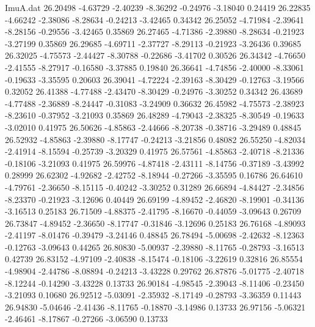 \begin{filecontents}{ImuA.dat}
  26.20498   -4.63729   -2.40239   -8.36292   -0.24976   -3.18040    0.24419
  26.22835   -4.66242   -2.38086   -8.28634   -0.24213   -3.42465    0.34342
  26.25052   -4.71984   -2.39641   -8.28156   -0.29556   -3.42465    0.35869
  26.27465   -4.71386   -2.39880   -8.28634   -0.21923   -3.27199    0.35869
  26.29685   -4.69711   -2.37727   -8.29113   -0.21923   -3.26436    0.39685
  26.32025   -4.75573   -2.44427   -8.30788   -0.22686   -3.41702    0.30526
  26.34342   -4.76650   -2.41555   -8.27917   -0.16580   -3.37885    0.19840
  26.36641   -4.74856   -2.40000   -8.33061   -0.19633   -3.35595    0.20603
  26.39041   -4.72224   -2.39163   -8.30429   -0.12763   -3.19566    0.32052
  26.41388   -4.77488   -2.43470   -8.30429   -0.24976   -3.30252    0.34342
  26.43689   -4.77488   -2.36889   -8.24447   -0.31083   -3.24909    0.36632
  26.45982   -4.75573   -2.38923   -8.23610   -0.37952   -3.21093    0.35869
  26.48289   -4.79043   -2.38325   -8.30549   -0.19633   -3.02010    0.41975
  26.50626   -4.85863   -2.44666   -8.20738   -0.38716   -3.29489    0.48845
  26.52932   -4.85863   -2.39880   -8.17747   -0.24213   -3.21856    0.48082
  26.55250   -4.82034   -2.41914   -8.15594   -0.25739   -3.20329    0.41975
  26.57561   -4.85863   -2.40718   -8.21336   -0.18106   -3.21093    0.41975
  26.59976   -4.87418   -2.43111   -8.14756   -0.37189   -3.43992    0.28999
  26.62302   -4.92682   -2.42752   -8.18944   -0.27266   -3.35595    0.16786
  26.64610   -4.79761   -2.36650   -8.15115   -0.40242   -3.30252    0.31289
  26.66894   -4.84427   -2.34856   -8.23370   -0.21923   -3.12696    0.40449
  26.69199   -4.89452   -2.46820   -8.19901   -0.34136   -3.16513    0.25183
  26.71509   -4.88375   -2.41795   -8.16670   -0.44059   -3.09643    0.26709
  26.73847   -4.89452   -2.36650   -8.17747   -0.31846   -3.12696    0.25183
  26.76168   -4.89093   -2.41197   -8.01476   -0.39479   -3.24146    0.48845
  26.78494   -5.00698   -2.42632   -8.12363   -0.12763   -3.09643    0.44265
  26.80830   -5.00937   -2.39880   -8.11765   -0.28793   -3.16513    0.42739
  26.83152   -4.97109   -2.40838   -8.15474   -0.18106   -3.22619    0.32816
  26.85554   -4.98904   -2.44786   -8.08894   -0.24213   -3.43228    0.29762
  26.87876   -5.01775   -2.40718   -8.12244   -0.14290   -3.43228    0.13733
  26.90184   -4.98545   -2.39043   -8.11406   -0.23450   -3.21093    0.10680
  26.92512   -5.03091   -2.35932   -8.17149   -0.28793   -3.36359    0.11443
  26.94830   -5.04646   -2.41436   -8.11765   -0.18870   -3.14986    0.13733
  26.97156   -5.06321   -2.46461   -8.17867   -0.27266   -3.06590    0.13733

\end{filecontents}
